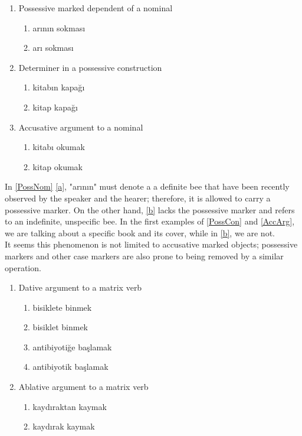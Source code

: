 \documentclass[11pt]{article} %
\begin{document}
\begin{enumerate}[resume*] 
	\item Possessive marked dependent of a nominal \label{PossNom}
	\begin{enumerate}[label=(\alph*), ref=(\alph*)]\itemsep1pt
	\item arının sokması \label{a}
	\item arı sokması \label{b}
	\end{enumerate}

	\item Determiner in a possessive construction \label{PossCon}
	\begin{enumerate}[label=(\alph*), ref=(\alph*)]\itemsep1pt
	\item kitabın kapağı \label{a}
	\item kitap kapağı \label{b}
	\end{enumerate}
	
	\item Accusative argument to a nominal \label{AccArg}
	\begin{enumerate}[label=(\alph*), ref=(\alph*)]\itemsep1pt
	\item kitabı okumak \label{a}
	\item kitap okumak \label{b}
	\end{enumerate}
\end{enumerate}

In \ref{PossNom} \ref{a}, "arının" must denote a a definite bee that have been recently observed by the speaker and the hearer; therefore, it is allowed to carry a possessive marker. On the other hand, \ref{b} lacks the possessive marker and refers to an indefinite, unspecific bee. In the first examples of \ref{PossCon} and \ref{AccArg}, we are talking about a specific book and its cover, while in \ref{b}, we are not. \\

It seems this phenomenon is not limited to accusative marked objects; possessive markers and other case markers are also prone to being removed by a similar operation. 

\begin{enumerate}[resume*] 
	\item Dative argument to a matrix verb \label{DatArg}
	\begin{enumerate}[label=(\alph*), ref=(\alph*)]\itemsep1pt
	\item bisiklete binmek \label{a}
	\item bisiklet binmek \label{b}
	\item antibiyotiğe başlamak \label{c}
	\item antibiyotik başlamak \label{d}
	\end{enumerate}
	
	\item Ablative argument to a matrix verb \label{AblArg}
	\begin{enumerate}[label=(\alph*), ref=(\alph*)]\itemsep1pt
	\item kaydıraktan kaymak \label{a}
	\item kaydırak kaymak \label{b}
	\end{enumerate}
\end{enumerate}
\end{document}

